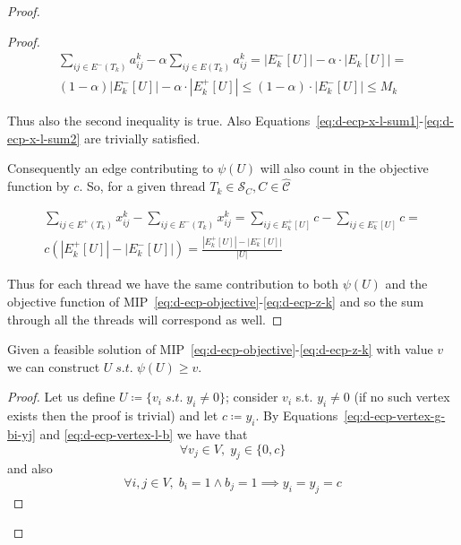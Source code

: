 \begin{proof}
\begin{proof}
		\begin{multline}
			\sum^{}_{ij \in E^{-} (T_k)} a_{ij}^{k}  - \alpha \sum^{}_{ij \in E(T_k)}
			a_{ij} ^{k} = |E^{-}_{k}[U]| - \alpha \cdot |E_{k}[U]| = \\
			(1- \alpha)|E^{-}_{k}[U]| - \alpha \cdot |E^{+}_{k}[U]| \leq
			(1 -\alpha) \cdot |E^{-}_{k}[U]| \leq M_k
		\end{multline}

		Thus also the second inequality is true. Also
		Equations~\ref{eq:d-ecp-x-l-sum1}-\ref{eq:d-ecp-x-l-sum2} are trivially
		satisfied.

		\bigskip
		Consequently an edge contributing to $\psi(U)$ will also count in the
		objective function by $c$. So, for a given thread $T_k \in \mathcal{S}_C, C \in \mathcal{\hat{C}}$

		\begin{multline*}
			\sum^{}_{ij \in E^{+} (T_{k})} x_{ij} ^{k} - \sum_{ij \in E^{-}
				(T_{k})} x_{ij} ^{k} = \sum^{}_{ij \in E^{+}_k[U] } c - \sum_{ij \in E^{-}
			_k[U]} c = \\ c (|E^{+}_{k}[U]| - |E^{-}_{k}[U]|) =
			\frac{|E^{+}_{k}[U]| - |E^{-}_{k}[U]|}{|U|}
		\end{multline*}

		Thus for each thread we have the same contribution to both $\psi(U)$
		and the objective function of
		MIP~\ref{eq:d-ecp-objective}-\ref{eq:d-ecp-z-k} and so the sum through
		all the threads will correspond as well.
	\end{proof}

	\begin{claim}
		Given a feasible solution of
		MIP~\ref{eq:d-ecp-objective}-\ref{eq:d-ecp-z-k} with value $v$ we can
		construct $U \; s.t. \; \psi(U) \geq v$.
	\end{claim}

	\begin{proof}

		Let us define $U \coloneqq \{ v_i \; s.t. \; y_i \neq 0\}$; consider
		$v_i$ s.t. $y_i \neq 0$ (if no such vertex exists then the proof is
		trivial) and let $c \coloneqq y_i$. By
		Equations~\ref{eq:d-ecp-vertex-g-bi-yj} and \ref{eq:d-ecp-vertex-l-b}
		we have that
		\begin{equation}
			\label{eq:d-ecpp-y-in}
			\forall v_j \in V, \; y_j \in \{ 0, c\}
		\end{equation}
		and also
		\begin{equation}
			\forall i, j \in V, \; b_i = 1 \land b_j = 1 \implies y_i = y_j = c
		\end{equation}


\end{proof}
\end{proof}

